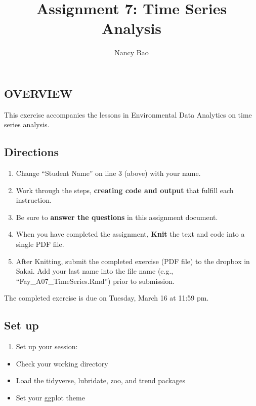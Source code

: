 \documentclass[
]{article}
\title{Assignment 7: Time Series Analysis}
\author{Nancy Bao}
\date{}
\providecommand{\tightlist}{%
  \setlength{\itemsep}{0pt}\setlength{\parskip}{0pt}}
\begin{document}
\maketitle

\hypertarget{overview}{%
\subsection{OVERVIEW}\label{overview}}

This exercise accompanies the lessons in Environmental Data Analytics on
time series analysis.

\hypertarget{directions}{%
\subsection{Directions}\label{directions}}

\begin{enumerate}
\def\labelenumi{\arabic{enumi}.}
\tightlist
\item
  Change ``Student Name'' on line 3 (above) with your name.
\item
  Work through the steps, \textbf{creating code and output} that fulfill
  each instruction.
\item
  Be sure to \textbf{answer the questions} in this assignment document.
\item
  When you have completed the assignment, \textbf{Knit} the text and
  code into a single PDF file.
\item
  After Knitting, submit the completed exercise (PDF file) to the
  dropbox in Sakai. Add your last name into the file name (e.g.,
  ``Fay\_A07\_TimeSeries.Rmd'') prior to submission.
\end{enumerate}

The completed exercise is due on Tuesday, March 16 at 11:59 pm.

\hypertarget{set-up}{%
\subsection{Set up}\label{set-up}}

\begin{enumerate}
\def\labelenumi{\arabic{enumi}.}
\tightlist
\item
  Set up your session:
\end{enumerate}

\begin{itemize}
\tightlist
\item
  Check your working directory
\item
  Load the tidyverse, lubridate, zoo, and trend packages
\item
  Set your ggplot theme
\end{itemize}
\end{document}
